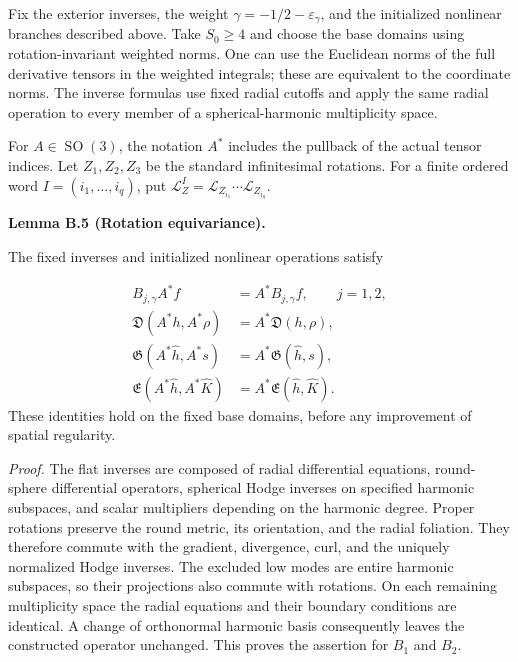 \documentclass[
  english,
  11pt,
  reqno]{amsart}
\makeatletter
\newcommand{\pandocstatementheading}[1]{%
  \par\addpenalty{\@beginparpenalty}%
  \addvspace{.5\baselineskip plus .2\baselineskip minus .2\baselineskip}%
  {\normalfont\bfseries #1\par}%
  \nobreak\@afterindenttrue\@afterheading
}
\makeatother
\begin{document}
Fix the exterior inverses, the weight
\(\gamma=-1/2-\varepsilon_\gamma\), and the initialized nonlinear
branches described above. Take \(S_0\ge4\) and choose the base domains
using rotation-invariant weighted norms. One can use the Euclidean norms
of the full derivative tensors in the weighted integrals; these are
equivalent to the coordinate norms. The inverse formulas use fixed
radial cutoffs and apply the same radial operation to every member of a
spherical-harmonic multiplicity space.

For \(A\in\operatorname{SO}(3)\), the notation \(A^*\) includes the
pullback of the actual tensor indices. Let \(Z_1,Z_2,Z_3\) be the
standard infinitesimal rotations. For a finite ordered word
\(I=(i_1,\ldots,i_q)\), put
\(\mathcal L_Z^I=\mathcal L_{Z_{i_1}}\cdots\mathcal L_{Z_{i_q}}\).

\pandocstatementheading{\leavevmode{}\label{lem:online-extension-rotation-equivariance}Lemma B.5 (Rotation equivariance).}

The fixed inverses and initialized nonlinear operations satisfy

\label{eq:online-extension-rotation-identities} \[
\begin{aligned}
B_{j,\gamma}A^*f&=A^*B_{j,\gamma}f,\qquad j=1,2,\\
\mathfrak D(A^*h,A^*\rho)&=A^*\mathfrak D(h,\rho),\\
\mathfrak G(A^*\widehat h,A^*s)&=A^*\mathfrak G(\widehat h,s),\\
\mathfrak E(A^*\widehat h,A^*\widehat K)
&=A^*\mathfrak E(\widehat h,\widehat K).
\end{aligned}
\] These identities hold on the fixed base domains, before any
improvement of spatial regularity.

\emph{Proof.} The flat inverses are composed of radial differential
equations, round-sphere differential operators, spherical Hodge inverses
on specified harmonic subspaces, and scalar multipliers depending on the
harmonic degree. Proper rotations preserve the round metric, its
orientation, and the radial foliation. They therefore commute with the
gradient, divergence, curl, and the uniquely normalized Hodge inverses.
The excluded low modes are entire harmonic subspaces, so their
projections also commute with rotations. On each remaining multiplicity
space the radial equations and their boundary conditions are identical.
A change of orthonormal harmonic basis consequently leaves the
constructed operator unchanged. This proves the assertion for \(B_1\)
and \(B_2\).
\end{document}
